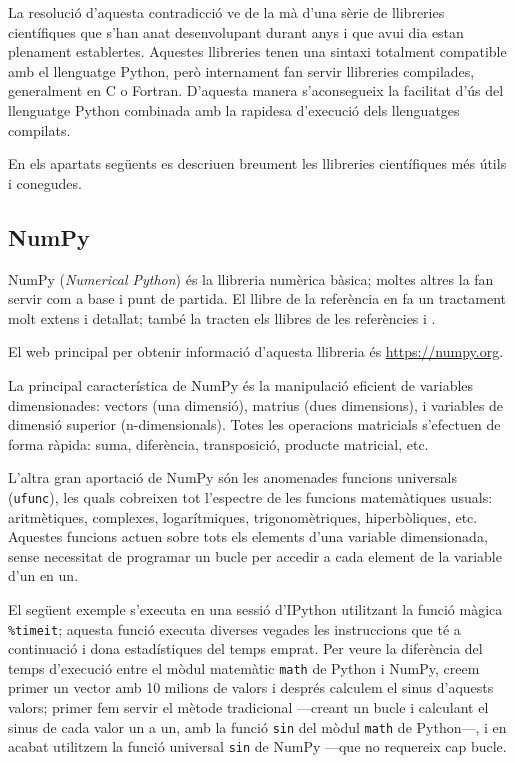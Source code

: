 La resolució d'aquesta  contradicció ve de la mà d'una sèrie de llibreries científiques que s'han anat desenvolupant durant anys i que avui dia estan plenament establertes. Aquestes llibreries tenen una sintaxi totalment compatible amb el llenguatge Python, però internament fan servir llibreries compilades, generalment en C o Fortran. D'aquesta manera s'aconsegueix la facilitat d'ús del llenguatge Python combinada amb la rapidesa d'execució dels llenguatges compilats.

En els apartats següents es descriuen breument  les llibreries científiques més útils i conegudes.

\subsection{NumPy}

NumPy  (\textit{Numerical Python}) és la llibreria numèrica bàsica; moltes altres la  fan servir com a base i punt de partida. El llibre de la referència \cite{VAN} en fa un tractament molt extens i detallat; també la tracten els llibres de les referències \cite{JOH} i \cite{HIL}.

El  web principal per obtenir informació d'aquesta llibreria és \href{https://numpy.org/}{https://numpy.org}.

La principal característica de NumPy és la manipulació eficient de variables dimensionades: vectors (una dimensió), matrius (dues dimensions), i variables de dimensió superior (n-dimensionals). Totes les operacions matricials s'efectuen de forma ràpida: suma, diferència, transposició, producte matricial, etc.

L'altra gran aportació de NumPy són les anomenades funcions universals (\texttt{ufunc}), les quals cobreixen tot l'espectre de les funcions matemàtiques usuals: aritmètiques, complexes, logarítmiques, trigonomètriques, hiperbòliques, etc. Aquestes funcions actuen sobre tots els elements d'una variable dimensionada, sense necessitat de programar un bucle per accedir a cada element de la variable d'un en un. 

El següent exemple s'executa en una sessió d'IPython utilitzant la funció màgica \texttt{\%timeit}; aquesta funció executa diverses vegades les instruccions que té a continuació i dona estadístiques del temps emprat. Per veure la diferència del temps d'execució entre el mòdul matemàtic \texttt{math} de Python  i NumPy, creem primer un vector amb 10 milions de valors i després calculem el sinus d'aquests valors; primer fem servir el mètode tradicional ---creant un bucle i calculant el sinus de cada valor un a un, amb la funció \texttt{sin} del mòdul \texttt{math} de Python---, i en acabat utilitzem la funció universal \texttt{sin} de NumPy ---que no requereix cap bucle.

